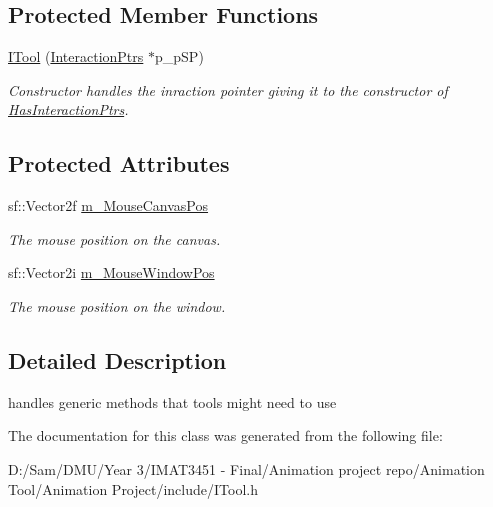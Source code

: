 \subsection*{Protected Member Functions}
\begin{DoxyCompactItemize}
\item 
\mbox{\label{class_i_tool_a79901d47b06c21ac66ae4b5dea63a72d}} 
\hyperlink{class_i_tool_a79901d47b06c21ac66ae4b5dea63a72d}{I\+Tool} (\hyperlink{struct_interaction_ptrs}{Interaction\+Ptrs} $\ast$p\+\_\+p\+SP)
\begin{DoxyCompactList}\small\item\em Constructor handles the inraction pointer giving it to the constructor of \hyperlink{class_has_interaction_ptrs}{Has\+Interaction\+Ptrs}. \end{DoxyCompactList}\end{DoxyCompactItemize}
\subsection*{Protected Attributes}
\begin{DoxyCompactItemize}
\item 
\mbox{\label{class_i_tool_af99caebe9dc3aa965571408f20be0749}} 
sf\+::\+Vector2f \hyperlink{class_i_tool_af99caebe9dc3aa965571408f20be0749}{m\+\_\+\+Mouse\+Canvas\+Pos}
\begin{DoxyCompactList}\small\item\em The mouse position on the canvas. \end{DoxyCompactList}\item 
\mbox{\label{class_i_tool_a5231eb512a418f4e621f23d0c7fb4c6e}} 
sf\+::\+Vector2i \hyperlink{class_i_tool_a5231eb512a418f4e621f23d0c7fb4c6e}{m\+\_\+\+Mouse\+Window\+Pos}
\begin{DoxyCompactList}\small\item\em The mouse position on the window. \end{DoxyCompactList}\end{DoxyCompactItemize}


\subsection{Detailed Description}
handles generic methods that tools might need to use 

The documentation for this class was generated from the following file\+:\begin{DoxyCompactItemize}
\item 
D\+:/\+Sam/\+D\+M\+U/\+Year 3/\+I\+M\+A\+T3451 -\/ Final/\+Animation project repo/\+Animation Tool/\+Animation Project/include/I\+Tool.\+h\end{DoxyCompactItemize}
